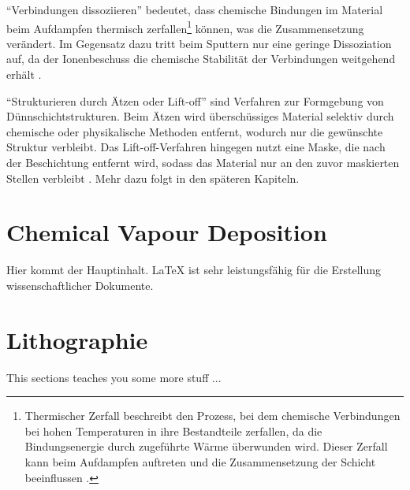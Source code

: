 \documentclass{article} %
\begin{document}
\vspace{1em}

``Verbindungen dissoziieren'' bedeutet, dass chemische Bindungen im Material beim Aufdampfen thermisch zerfallen\footnote{Thermischer Zerfall beschreibt den Prozess, 
bei dem chemische Verbindungen bei hohen Temperaturen in ihre Bestandteile zerfallen, da die Bindungsenergie durch zugeführte Wärme überwunden wird. Dieser Zerfall 
kann beim Aufdampfen auftreten und die Zusammensetzung der Schicht beeinflussen \cite{ohring2002, smith1995}.} können, was die Zusammensetzung verändert. Im 
Gegensatz dazu tritt beim Sputtern nur eine geringe Dissoziation auf, da der Ionenbeschuss die chemische Stabilität der Verbindungen weitgehend erhält 
\cite{ohring2002, smith1995, rossnagel2003magnetron}.

\vspace{1em}
``Strukturieren durch Ätzen oder Lift-off'' sind Verfahren zur Formgebung von Dünnschichtstrukturen. Beim Ätzen wird überschüssiges Material selektiv durch 
chemische oder physikalische Methoden entfernt, wodurch nur die gewünschte Struktur verbleibt. Das Lift-off-Verfahren hingegen nutzt eine Maske, die nach der 
Beschichtung entfernt wird, sodass das Material nur an den zuvor maskierten Stellen verbleibt \cite{ohring2002, smith1995, prechtl2005grundlagen}. Mehr dazu folgt 
in den späteren Kapiteln.

\vspace{1em}
\section{Chemical Vapour Deposition} %
Hier kommt der Hauptinhalt. \LaTeX{} ist sehr leistungsfähig für die Erstellung wissenschaftlicher Dokumente.

\vspace{1em}
\section{Lithographie} %
This sections teaches you some more stuff ...

\thispagestyle{empty}
\newpage
\end{document}
